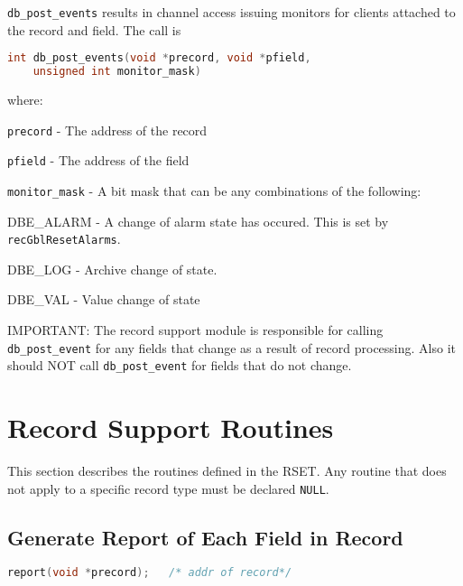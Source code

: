\verb|db_post_events| results in channel access issuing monitors for clients attached to the record and field.
The call is

\begin{lstlisting}[language=C]
int db_post_events(void *precord, void *pfield,
    unsigned int monitor_mask)
\end{lstlisting}
where:
\begin{description}
\item \verb|precord| - The address of the record

\item \verb|pfield| - The address of the field

\item \verb|monitor_mask| - A bit mask that can be any combinations of the following:


\begin{description}

\item {}DBE\_ALARM - A change of alarm state has occured.
This is set by \verb|recGblResetAlarms|.

\item {}DBE\_LOG - Archive change of state.

\item {}DBE\_VAL - Value change of state

\end{description}

\end{description}
IMPORTANT:
The record support module is responsible for calling \verb|db_post_event| for any fields that change as a result of record processing.
Also it should NOT call \verb|db_post_event| for fields that do not change.

\section{Record Support Routines}

This section describes the routines defined in the RSET.
Any routine that does not apply to a specific record type must be declared \verb|NULL|.

\subsection{Generate Report of Each Field in Record}

\begin{lstlisting}[language=C]
report(void *precord);   /* addr of record*/
\end{lstlisting}

